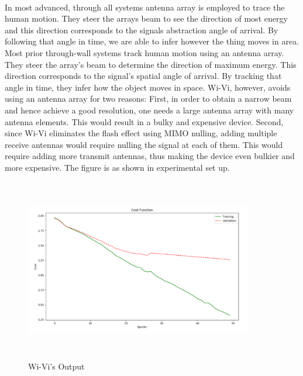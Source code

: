 \documentclass[a4paper,12pt,oneside]{article}
\begin{document}
\paragraph{}
In most advanced, through all systems antenna array is employed to trace the human motion.
They steer the arrays beam to see the direction of most energy and this direction corresponds to
the signals abstraction angle of arrival. By following that angle in time, we are able to infer
however the thing moves in area. Most prior through-wall systems track human motion using an
antenna array. They steer the array’s beam to determine the direction of maximum energy. This
direction corresponds to the signal’s spatial angle of arrival. By tracking that angle in time, they
infer how the object moves in space. Wi-Vi, however, avoids using an antenna array for two
reasons: First, in order to obtain a narrow beam and hence achieve a good resolution, one needs a
large antenna array with many antenna elements. This would result in a bulky and expensive
device. Second, since Wi-Vi eliminates the flash effect using MIMO nulling, adding multiple
receive antennas would require nulling the signal at each of them. This would require adding
more transmit antennas, thus making the device even bulkier and more expensive. The figure is
as shown in experimental set up.

\begin{figure}[H]
\centering
\includegraphics[height=8cm,width=10cm]{6.png}
\caption{Wi-Vi's Output}
\end{figure}
\end{document}
